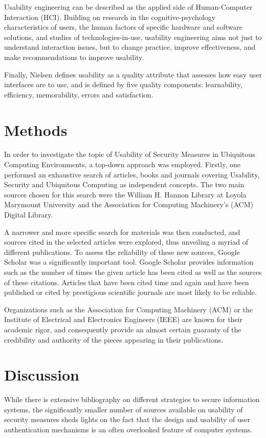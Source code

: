 \documentclass{article}
\begin{document}
Usability engineering can be described as the applied side of Human-Computer Interaction (HCI). Building on research in the cognitive-psychology characteristics of users, the human factors of specific hardware and software solutions, and studies of technologies-in-use, usability engineering aims not just to understand interaction issues, but to change practice, improve effectiveness, and make recommendations to improve usability.  

Finally, Nielsen\cite{nielsenusability2012} defines usability as a quality attribute that assesses how easy user interfaces are to use, and is defined by five quality components: learnability, efficiency, memorability, errors and satisfaction. 

\section{Methods}
In order to investigate the topic of Usability of Security Measures in Ubiquitous Computing Environments, a top-down approach was employed. Firstly, one performed an exhaustive search of articles, books and journals covering Usability, Security and Ubiquitous Computing as independent concepts. The two main sources chosen for this search were the William H. Hannon Library at Loyola Marymount University and the Association for Computing Machinery's (ACM) Digital Library.  

A narrower and more specific search for materials was then conducted, and sources cited in the selected articles were explored, thus unveiling a myriad of different publications. To assess the reliability of these new sources, Google Scholar was a significantly important tool. Google Scholar provides information such as the number of times the given article has been cited as well as the sources of these citations.  Articles that have been cited time and again and have been published or cited by prestigious scientific journals are most likely to be reliable.

Organizations such as the Association for Computing Machinery (ACM) or the Institute of Electrical and Electronics Engineers (IEEE) are known for their academic rigor, and consequently provide an almost certain guaranty of the credibility and authority of the pieces appearing in their publications. 


\section{Discussion}
While there is extensive bibliography on different strategies to secure information systems, the significantly smaller number of sources available on usability of security measures sheds lights on the fact that the design and usability of user authentication mechanisms is an often overlooked feature of computer systems.
\end{document}
